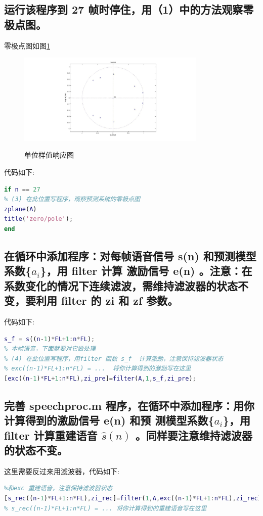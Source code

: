 \documentclass{ctexart}
\begin{document}
\subsection{
运行该程序到 27 帧时停住，用（1）中的方法观察零极点图。 }

零极点图如图\ref{2zp}
\begin{figure}
    \centering
    \includegraphics[width=0.8\textwidth]{2_zp.jpg}\\
    \caption{单位样值响应图\label{2zp}}
\end{figure}

代码如下:
\begin{lstlisting}[language=matlab]
if n == 27
% (3) 在此位置写程序，观察预测系统的零极点图
zplane(A)
title('zero/pole'); 
end
\end{lstlisting}

\subsection{
    在循环中添加程序：对每帧语音信号 s(n) 和预测模型系数\{$a_i$\}，用 filter 计算 激励信号 e(n) 。注意：在系数变化的情况下连续滤波，需维持滤波器的状态不变，要利用
    filter 的 zi 和 zf 参数。
}
代码如下:
\begin{lstlisting}[language=matlab]
s_f = s((n-1)*FL+1:n*FL);       
% 本帧语音，下面就要对它做处理
% (4) 在此位置写程序，用filter 函数 s_f  计算激励，注意保持滤波器状态
% exc((n-1)*FL+1:n*FL) = ...  将你计算得到的激励写在这里
[exc((n-1)*FL+1:n*FL),zi_pre]=filter(A,1,s_f,zi_pre);
\end{lstlisting}

\subsection{
完善 speechproc.m 程序，在循环中添加程序：用你计算得到的激励信号 e(n) 和预 测模型系数\{$a_i$\}，用 filter 计算重建语音 $\hat{s}(n)$ 。同样要注意维持滤波器的状态不变。 }

这里需要反过来用滤波器，代码如下:
\begin{lstlisting}[language=matlab]
% (5) 在此位置写程序，用filter 函数
%和exc 重建语音，注意保持滤波器状态
[s_rec((n-1)*FL+1:n*FL),zi_rec]=filter(1,A,exc((n-1)*FL+1:n*FL),zi_rec);
% s_rec((n-1)*FL+1:n*FL) = ... 将你计算得到的重建语音写在这里
\end{lstlisting}
\end{document}
